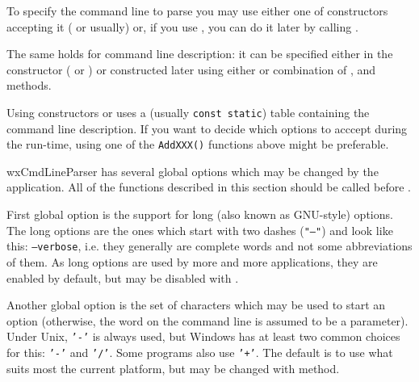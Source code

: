 To specify the command line to parse you may use either one of constructors
accepting it ( or 
 usually) or,
if you use ,
you can do it later by calling 
.

The same holds for command line description: it can be specified either in
the constructor ( or 
) or
constructed later using either  or
combination of , 
 and 
 methods.

Using constructors or  uses a (usually 
{\tt const static}) table containing the command line description. If you want
to decide which options to acccept during the run-time, using one of the 
{\tt AddXXX()} functions above might be preferable.

\label{wxcmdlineparsercustomization}

wxCmdLineParser has several global options which may be changed by the
application. All of the functions described in this section should be called
before .

First global option is the support for long (also known as GNU-style) options.
The long options are the ones which start with two dashes ({\tt "--"}) and look
like this: {\tt --verbose}, i.e. they generally are complete words and not some
abbreviations of them. As long options are used by more and more applications,
they are enabled by default, but may be disabled with 
.

Another global option is the set of characters which may be used to start an
option (otherwise, the word on the command line is assumed to be a parameter).
Under Unix, {\tt '-'} is always used, but Windows has at least two common
choices for this: {\tt '-'} and {\tt '/'}. Some programs also use {\tt '+'}.
The default is to use what suits most the current platform, but may be changed
with  method.

